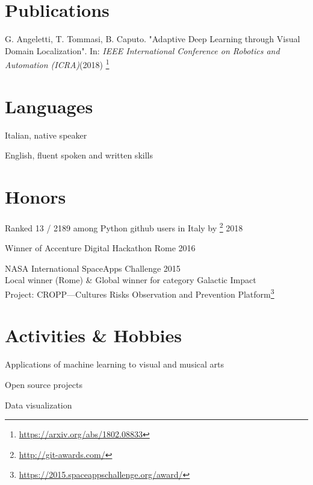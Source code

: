 \documentclass[margin]{res}
\begin{document}
\begin{resume}
        \section{Publications}
        \begin{description}
            \item G. Angeletti, T. Tommasi, B. Caputo.
                "Adaptive Deep Learning through Visual Domain Localization".
                In: \textit{IEEE International Conference on Robotics and Automation (ICRA)}(2018) \footnote{\url{https://arxiv.org/abs/1802.08833}}
        \end{description}

        \section{Languages}
        \begin{description}
            \item Italian, native speaker
            \item English, fluent spoken and written skills
        \end{description}

        \section{Honors}
        \begin{description}
            \item Ranked 13 / 2189 among Python github users in Italy by \footnote{\url{http://git-awards.com/}} \hfill 2018
            \item Winner of Accenture Digital Hackathon Rome \hfill 2016
            \item NASA International SpaceApps Challenge \hfill 2015\\
                Local winner (Rome) \& Global winner for category Galactic Impact\\
                Project: CROPP---Cultures Risks Observation and Prevention
                Platform\footnote{\url{https://2015.spaceappschallenge.org/award/}}
        \end{description}

        \section{Activities \& Hobbies}
        \begin{description}
        	\item Applications of machine learning to visual and musical arts
            \item Open source projects
            \item Data visualization
        \end{description}
    \end{resume}
\end{document}
